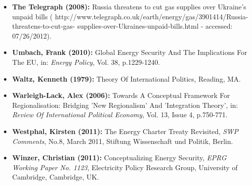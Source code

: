 \documentclass[11pt,a4paper,english]{scrreprt}
\begin{document}
\begin{itemize}
\item [\Rectsteel] \textbf{The Telegraph (2008):} Russia threatens to cut gas
supplies over Ukraine's unpaid bills (\textcolor{dunkelgrau.80}{
http://www.telegraph.co.uk/earth/energy/gas/3901414/Russia-threatens-to-cut-gas-
supplies-over-Ukraines-unpaid-bills.html} - accessed:\\
07/26/2012).



	\item [\Rectsteel] \textbf{Umbach, Frank (2010):} Global Energy
Security And The Implications For The EU, in: \textsl{Energy Policy}, Vol.
38, p.1229-1240.



	\item [\Rectsteel] \textbf{Waltz, Kenneth (1979):} Theory Of
International Politics, Reading, MA.



	\item [\Rectsteel] \textbf{Warleigh-Lack, Alex (2006):} Towards A
Conceptual Framework For Regionalisation: Bridging 'New Regionalism' And
'Integration Theory', in: \textsl{Review Of International Political Economy},
Vol. 13, Issue 4, p.750-771.



	\item [\Rectsteel] \textbf{Westphal, Kirsten (2011):} The Energy
Charter Treaty Revisited, \textsl{SWP Comments}, No.8, March 2011, Stiftung
Wissenschaft und Politik, Berlin.



	\item [\Rectsteel] \textbf{Winzer, Christian (2011):} Conceptualizing
Energy Security, \textsl{EPRG Working Paper No. 1123}, Electricity Policy
Research Group, University of Cambridge, Cambridge, UK.



  \end{itemize}
\end{document}
